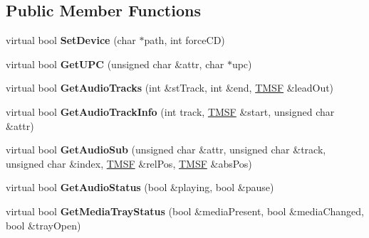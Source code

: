 \subsection*{Public Member Functions}
\begin{DoxyCompactItemize}
\item 
\hypertarget{classCDROM__Interface__SDL_ac2830ccd403b203edadd17f2b69525d3}{virtual bool {\bfseries Set\-Device} (char $\ast$path, int force\-C\-D)}\label{classCDROM__Interface__SDL_ac2830ccd403b203edadd17f2b69525d3}

\item 
\hypertarget{classCDROM__Interface__SDL_a71ac58fc052e29d96e79ef6234e6abbb}{virtual bool {\bfseries Get\-U\-P\-C} (unsigned char \&attr, char $\ast$upc)}\label{classCDROM__Interface__SDL_a71ac58fc052e29d96e79ef6234e6abbb}

\item 
\hypertarget{classCDROM__Interface__SDL_a80e68ad21338f4ccc44361cbc079e67d}{virtual bool {\bfseries Get\-Audio\-Tracks} (int \&st\-Track, int \&end, \hyperlink{structSMSF}{T\-M\-S\-F} \&lead\-Out)}\label{classCDROM__Interface__SDL_a80e68ad21338f4ccc44361cbc079e67d}

\item 
\hypertarget{classCDROM__Interface__SDL_a8153067b1065412fc0c1b0de4afa58d8}{virtual bool {\bfseries Get\-Audio\-Track\-Info} (int track, \hyperlink{structSMSF}{T\-M\-S\-F} \&start, unsigned char \&attr)}\label{classCDROM__Interface__SDL_a8153067b1065412fc0c1b0de4afa58d8}

\item 
\hypertarget{classCDROM__Interface__SDL_a528bc5b106e883ab19a5b23d67f5b89a}{virtual bool {\bfseries Get\-Audio\-Sub} (unsigned char \&attr, unsigned char \&track, unsigned char \&index, \hyperlink{structSMSF}{T\-M\-S\-F} \&rel\-Pos, \hyperlink{structSMSF}{T\-M\-S\-F} \&abs\-Pos)}\label{classCDROM__Interface__SDL_a528bc5b106e883ab19a5b23d67f5b89a}

\item 
\hypertarget{classCDROM__Interface__SDL_aa26e937e9cb11094b9a75360462999c6}{virtual bool {\bfseries Get\-Audio\-Status} (bool \&playing, bool \&pause)}\label{classCDROM__Interface__SDL_aa26e937e9cb11094b9a75360462999c6}

\item 
\hypertarget{classCDROM__Interface__SDL_aff975ea549d6b3d650678c4d91b6ad22}{virtual bool {\bfseries Get\-Media\-Tray\-Status} (bool \&media\-Present, bool \&media\-Changed, bool \&tray\-Open)}\label{classCDROM__Interface__SDL_aff975ea549d6b3d650678c4d91b6ad22}


\end{DoxyCompactItemize}
